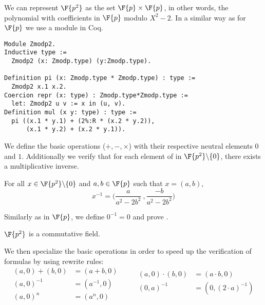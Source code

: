 We can represent $\F{p^2}$ as the set $\F{p} \times \F{p}$,
in other words,
the polynomial with coefficients in $\F{p}$ modulo $X^2 - 2$. In a similar way
as for $\F{p}$ we use a module in Coq.
\begin{lstlisting}[language=Coq]
Module Zmodp2.
Inductive type :=
  Zmodp2 (x: Zmodp.type) (y:Zmodp.type).

Definition pi (x: Zmodp.type * Zmodp.type) : type :=
  Zmodp2 x.1 x.2.
Coercion repr (x: type) : Zmodp.type*Zmodp.type :=
  let: Zmodp2 u v := x in (u, v).
Definition mul (x y: type) : type :=
  pi ((x.1 * y.1) + (2%:R * (x.2 * y.2)),
      (x.1 * y.2) + (x.2 * y.1)).
\end{lstlisting}

We define the basic operations ($+, -, \times$) with their respective neutral
elements $0$ and $1$. Additionally we verify that for each element of in
$\F{p^2}\backslash\{0\}$, there exists a multiplicative inverse.
\begin{lemma}
  \label{lemma:Zmodp2_inv}
  For all $x \in \F{p^2}\backslash\{0\}$ and $a,b \in \F{p}$ such that $x = (a,b)$,
  $$x^{-1} = \Big(\frac{a}{a^2-2b^2}\ , \frac{-b}{a^2-2b^2}\Big)$$
\end{lemma}
Similarly as in $\F{p}$, we define $0^{-1} = 0$ and prove .
\begin{lemma}
  \label{lemma:Zmodp2_field}
  $\F{p^2}$ is a commutative field.
\end{lemma}

We then specialize the basic operations in order to speed up the verification
of formulas by using rewrite rules:
\begin{equation*}
\begin{split}
(a,0) + (b,0) &= (a+b, 0)\\
(a, 0)^{-1} &= (a^{-1}, 0)\\
(a, 0)^n &= (a^n, 0)\\
\end{split}
\qquad
\begin{split}
(a,0) \cdot   (b,0) &= (a \cdot b, 0)\\
(0,a)^{-1} &= (0,(2\cdot a)^{-1})\\
~\\
\end{split}
\end{equation*}




